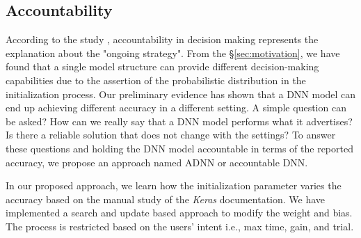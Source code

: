 \subsection{Accountability}
According to the study \cite{veale2018fairness}, accountability in decision making represents the explanation about the "ongoing strategy". From the \S\ref{sec:motivation}, we have found that a single model structure can provide different decision-making capabilities due to the assertion of the probabilistic distribution in the initialization process. Our preliminary evidence has shown that a DNN model can end up achieving different accuracy in a different setting. A simple question can be asked? How can we really say that a DNN model performs what it advertises? Is there a reliable solution that does not change with the settings?
To answer these questions and holding the DNN model accountable in terms of the reported accuracy, we propose an approach named ADNN or accountable DNN.

In our proposed approach, we learn how the initialization parameter varies the accuracy based on the manual study of the \emph{Keras} documentation. We have implemented a search and update based approach to modify the weight and bias. The process is restricted based on the users’ intent i.e., max time, gain, and trial.


